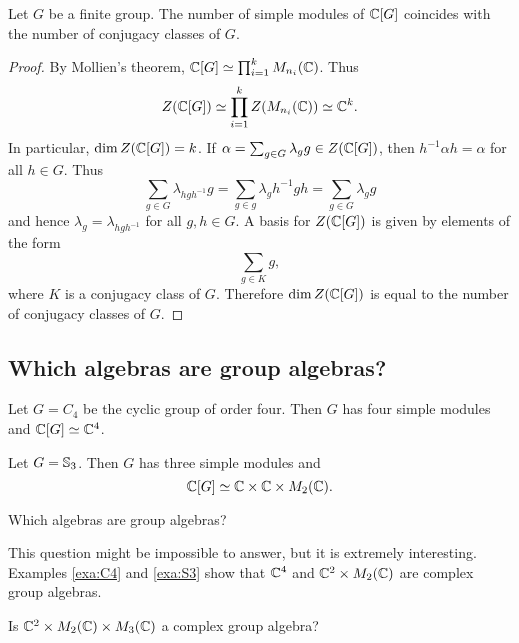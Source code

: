 \begin{theorem}
    Let $G$ be a finite group. The number of simple 
    modules of $\mathbb{C}[G]$ coincides with the number of conjugacy classes of $G$. 
\end{theorem}

\begin{proof}
    By Mollien's theorem, $\mathbb{C}[G]\simeq\prod_{i=1}^kM_{n_i}(\mathbb{C})$. Thus 
    \[
		Z(\mathbb{C}[G])\simeq\prod_{i=1}^kZ(M_{n_i}(\mathbb{C}))\simeq\mathbb{C}^k.
	\]
	In particular, $\dim Z(\mathbb{C}[G])=k$. If $\alpha=\sum_{g\in
	G}\lambda_gg\in Z(\mathbb{C}[G])$, then $h^{-1}\alpha h=\alpha$ for all $h\in
	G$. Thus 
	\[
		\sum_{g\in G}\lambda_{hgh^{-1}}g=
		\sum_{g\in g}\lambda_g h^{-1}gh=\sum_{g\in G}\lambda_gg
	\]
	and hence $\lambda_{g}=\lambda_{hgh^{-1}}$ for all $g,h\in G$. A basis for 
	$Z(\mathbb{C}[G])$ is given by elements of the form 
	\[
		\sum_{g\in K}g,
	\]
	where $K$ is a conjugacy class of $G$. Therefore $\dim Z(\mathbb{C}[G])$ is equal to 
	the number of conjugacy classes of $G$.
\end{proof}

\subsection{Which algebras are group algebras?}

\begin{example}
\label{exa:C4}
    Let $G=C_4$ be the cyclic group of order four. Then
    $G$ has four simple modules and 
    $\mathbb{C}[G]\simeq\mathbb{C}^4$. 
\end{example}

\begin{example}
\label{exa:S3}
    Let $G=\mathbb{S}_3$. Then $G$ has three simple modules and
    \[
    \mathbb{C}[G]\simeq\mathbb{C}\times\mathbb{C}\times M_2(\mathbb{C}).
    \]
\end{example}

\begin{problem}[Brauer]
    Which algebras are group algebras? 
\end{problem}

This question might be impossible to answer, but it is extremely interesting. 
Examples \ref{exa:C4} and \ref{exa:S3} show
that $\mathbb{C}^4$ and $\mathbb{C}^2\times M_2(\mathbb{C})$ are complex group algebras. 

\begin{exercise}
    Is $\mathbb{C}^2\times M_2(\mathbb{C})\times M_3(\mathbb{C})$ a complex group algebra?  
\end{exercise}


